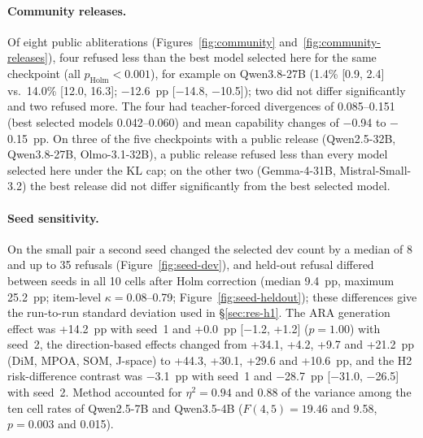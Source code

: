\paragraph{Community releases.} Of eight public abliterations
(Figures~\ref{fig:community} and~\ref{fig:community-releases}), four refused
less than the best model selected here for the same checkpoint (all
$p_\mathrm{Holm}<0.001$), for example on Qwen3.8-27B (1.4\% [0.9, 2.4] vs.\
14.0\% [12.0, 16.3]; $-$12.6~pp [$-$14.8, $-$10.5]); two did not differ significantly and two refused more. The
four had teacher-forced divergences of 0.085--0.151 (best selected models
0.042--0.060) and mean capability changes of $-$0.94 to $-$0.15~pp. On three
of the five checkpoints with a public release (Qwen2.5-32B, Qwen3.8-27B,
Olmo-3.1-32B), a public release refused less than every model selected here
under the KL cap; on the other two (Gemma-4-31B, Mistral-Small-3.2) the best
release did not differ significantly from the best selected model.


\paragraph{Seed sensitivity.} On the small pair a second seed changed the
selected dev count by a median of 8 and up to 35 refusals
(Figure~\ref{fig:seed-dev}), and held-out refusal differed between seeds in
all 10 cells after Holm correction (median 9.4~pp, maximum 25.2~pp;
item-level $\kappa=0.08$--0.79; Figure~\ref{fig:seed-heldout}); these
differences give the run-to-run standard deviation used in
\S\ref{sec:res-h1}. The ARA
generation effect was +14.2~pp with seed~1 and +0.0~pp [$-$1.2, +1.2]
($p=1.00$) with seed~2, the direction-based effects changed from +34.1, +4.2,
+9.7 and +21.2~pp (DiM, MPOA, SOM, J-space) to +44.3, +30.1, +29.6 and
+10.6~pp, and the H2 risk-difference contrast was $-$3.1~pp with seed~1 and
$-$28.7~pp [$-$31.0, $-$26.5] with seed~2. Method accounted for $\eta^2=0.94$ and 0.88
of the variance among the ten cell rates of Qwen2.5-7B and Qwen3.5-4B
($F(4,5)=19.46$ and 9.58, $p=0.003$ and 0.015).

